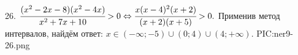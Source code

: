 26. $\cfrac{(x^2-2x-8)(x^2-4x)}{x^2+7x+10}>0\Leftrightarrow\cfrac{x(x-4)^2(x+2)}{(x+2)(x+5)}>0.$ Применив метод интервалов, найдём ответ: $x\in
(-\infty;-5)\cup(0;4)\cup(4;+\infty).$
{{PIC:ner9-26.png}}\\
